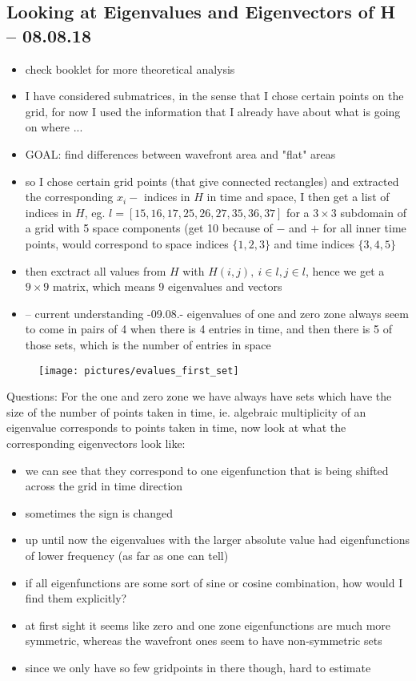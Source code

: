 \documentclass[a4paper, 11pt]{article}
\begin{document}
\subsection*{Looking at Eigenvalues and Eigenvectors of H -- 08.08.18}

\begin{itemize}
\item check booklet for more theoretical analysis 
\item I have considered submatrices, in the sense that I chose certain points on the grid, for now I used the information that I already have about what is going on where ... 
\item GOAL: find differences between wavefront area and "flat" areas
\item so I chose certain grid points (that give connected rectangles) and extracted the corresponding $x_i-$ indices in $H$ in time and space, I then get a list of indices in $H$, eg. $ l = [15 ,16 ,17, 25, 26, 27, 35, 36, 37]$ for a $3 \times 3$ subdomain of a grid with 5 space components (get 10 because of $-$ and $+$ for all inner time points, would correspond to space indices $\{1,2,3\}$ and time indices $\{3,4,5\}$
\item then exctract all values from $H$ with $H(i,j), \ i \in l, j \in l$, hence we get a $9 \times 9 $ matrix, which means 9 eigenvalues and vectors
\item -- current understanding -09.08.- eigenvalues of one and zero zone always seem to come in pairs of 4 when there is 4 entries in time, and then there is 5 of those sets, which is the number of entries in space
\end{itemize}

\begin{figure}[ht!]
	\centering
	\texttt{[image: pictures/evalues\_first\_set]}
\end{figure}

Questions: For the one and zero zone we have always have sets which have the size of the number of points taken in time, ie. algebraic multiplicity of an eigenvalue corresponds to points taken in time, now look at what the corresponding eigenvectors look like:

\begin{itemize}
	\item we can see that they correspond to one eigenfunction that is being shifted across the grid in time direction 
	\item sometimes the sign is changed
	\item up until now the eigenvalues with the larger absolute value had eigenfunctions of lower frequency (as far as one can tell)
	\item if all eigenfunctions are some sort of sine or cosine combination, how would I find them explicitly?
	\item at first sight it seems like zero and one zone eigenfunctions are much more symmetric, whereas the wavefront ones seem to have non-symmetric sets
	\item since we only have so few gridpoints in there though, hard to estimate 
	
\end{itemize}
\end{document}
